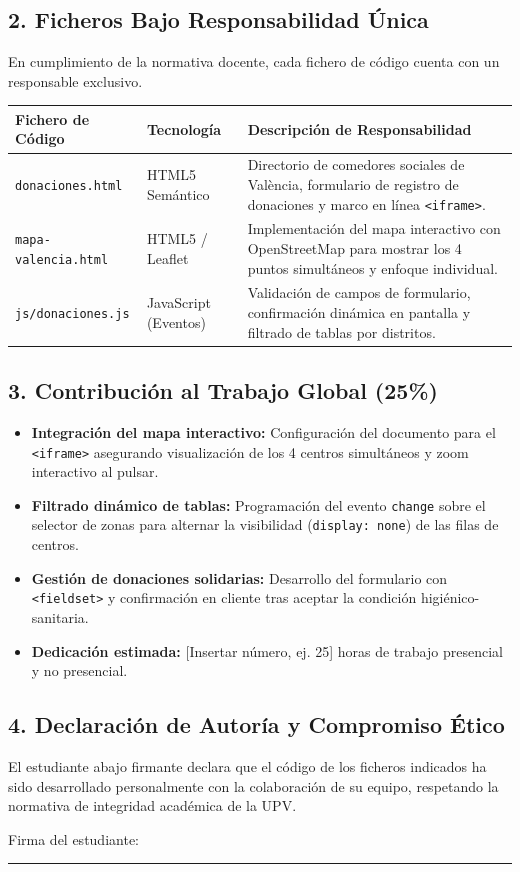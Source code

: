 \documentclass[11pt,a4paper]{article}
\begin{document}
\subsection*{2. Ficheros Bajo Responsabilidad Única}
En cumplimiento de la normativa docente, cada fichero de código cuenta con un responsable exclusivo.
\begin{table}[h!]
\centering
\small
\begin{tabularx}{\textwidth}{p{4cm} p{3.5cm} X}
\toprule
\textbf{Fichero de Código} & \textbf{Tecnología} & \textbf{Descripción de Responsabilidad} \\
\midrule
\texttt{donaciones.html} & HTML5 Semántico & Directorio de comedores sociales de València, formulario de registro de donaciones y marco en línea \texttt{<iframe>}. \\
\addlinespace
\texttt{mapa-valencia.html} & HTML5 / Leaflet & Implementación del mapa interactivo con OpenStreetMap para mostrar los 4 puntos simultáneos y enfoque individual. \\
\addlinespace
\texttt{js/donaciones.js} & JavaScript (Eventos) & Validación de campos de formulario, confirmación dinámica en pantalla y filtrado de tablas por distritos. \\
\bottomrule
\end{tabularx}
\end{table}

\subsection*{3. Contribución al Trabajo Global (25\%)}
\begin{itemize}
    \item \textbf{Integración del mapa interactivo:} Configuración del documento para el \texttt{<iframe>} asegurando visualización de los 4 centros simultáneos y zoom interactivo al pulsar.
    \item \textbf{Filtrado dinámico de tablas:} Programación del evento \texttt{change} sobre el selector de zonas para alternar la visibilidad (\texttt{display: none}) de las filas de centros.
    \item \textbf{Gestión de donaciones solidarias:} Desarrollo del formulario con \texttt{<fieldset>} y confirmación en cliente tras aceptar la condición higiénico-sanitaria.
    \item \textbf{Dedicación estimada:} [Insertar número, ej. 25] horas de trabajo presencial y no presencial.
\end{itemize}

\subsection*{4. Declaración de Autoría y Compromiso Ético}
El estudiante abajo firmante declara que el código de los ficheros indicados ha sido desarrollado personalmente con la colaboración de su equipo, respetando la normativa de integridad académica de la UPV.

\vspace{1.2cm}
\begin{flushright}
    Firma del estudiante:\ \rule{6cm}{0.4pt}
\end{flushright}
\end{document}
